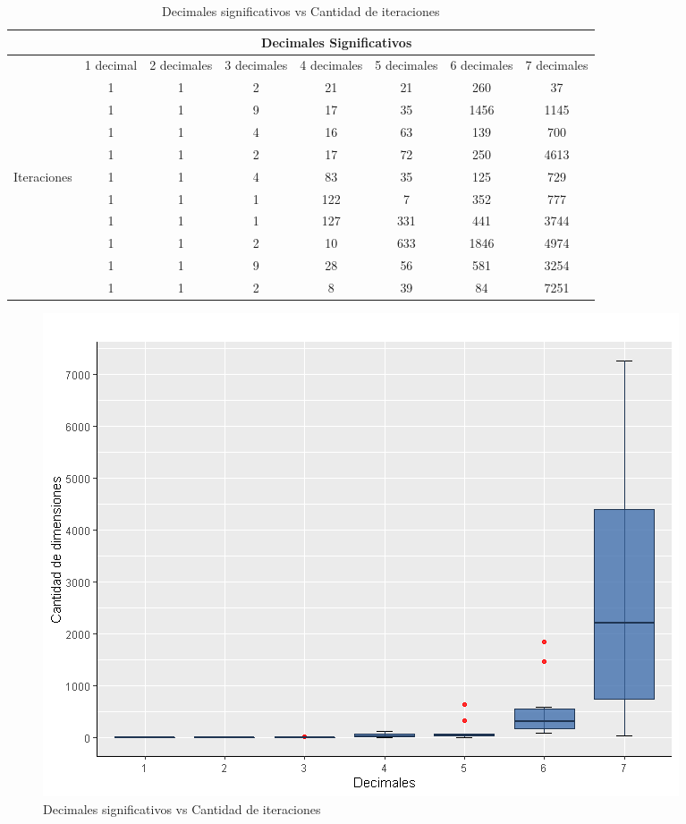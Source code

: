 \documentclass{article}
\begin{document}
\begin{table}[htbp]
	\centering
	\caption{Decimales significativos vs Cantidad de iteraciones}
	\begin{tabular}{|c|c|c|c|c|c|c|c|}
		\hline
		& \multicolumn{7}{c|}{Decimales Significativos} \\
		\hline
		& \multicolumn{1}{l|}{1 decimal} & \multicolumn{1}{l|}{2 decimales} & \multicolumn{1}{l|}{3 decimales} & \multicolumn{1}{l|}{4 decimales} & \multicolumn{1}{l|}{5 decimales} & \multicolumn{1}{l|}{6 decimales} & \multicolumn{1}{l|}{7 decimales} \\
		\hline
		& 1     & 1     & 2     & 21    & 21    & 260   & 37 \\
		\hline
		& 1     & 1     & 9     & 17    & 35    & 1456  & 1145 \\
		\hline
		& 1     & 1     & 4     & 16    & 63    & 139   & 700 \\
		\hline
		& 1     & 1     & 2     & 17    & 72    & 250   & 4613 \\
		\hline
		\multicolumn{1}{|l|}{Iteraciones} & 1     & 1     & 4     & 83    & 35    & 125   & 729 \\
		\hline
		& 1     & 1     & 1     & 122   & 7     & 352   & 777 \\
		\hline
		& 1     & 1     & 1     & 127   & 331   & 441   & 3744 \\
		\hline
		& 1     & 1     & 2     & 10    & 633   & 1846  & 4974 \\
		\hline
		& 1     & 1     & 9     & 28    & 56    & 581   & 3254 \\
		\hline
		& 1     & 1     & 2     & 8     & 39    & 84    & 7251 \\
		\hline
	\end{tabular}%
	\label{tab:addlabel}%
\end{table}%
\newpage
\begin{figure}[h]
	\centering
	\includegraphics[width=0.6\linewidth]{Rplot03}
	\caption{Decimales significativos vs Cantidad de iteraciones}
	\label{fig:imagen2}
\end{figure}
\end{document}
